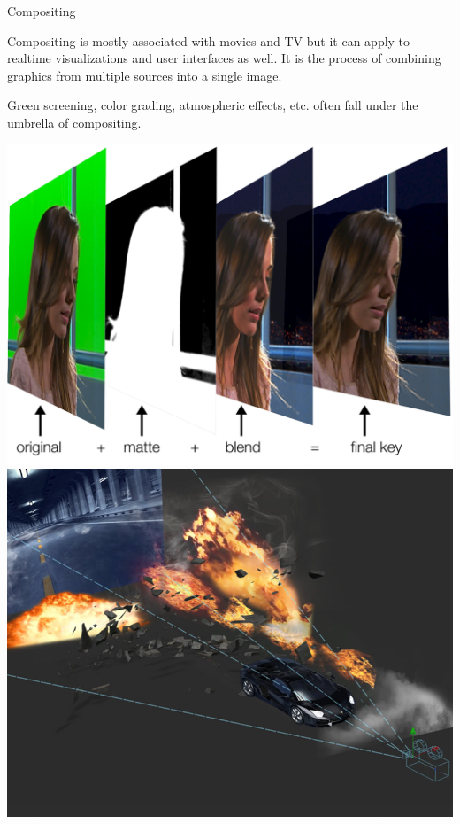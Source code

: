 \documentclass{lug}
\newcommand{\splitslide}[4]{
    \noindent
    \begin{minipage}{#1 \textwidth - #2 }
        #3
    \end{minipage}%
    \hspace{ \dimexpr #2 * 2 \relax }%
    \begin{minipage}{\textwidth - #1 \textwidth - #2 }
        #4
    \end{minipage}
}
\begin{document}
\begin{frame}{Compositing}
    \splitslide{0.65}{.7em}{
        \small

        Compositing is mostly associated with movies and TV but it can apply
        to realtime visualizations and user interfaces as well. It is the
        process of combining graphics from multiple sources into a single
        image.

        \vspace{1ex}

        Green screening, color grading, atmospheric effects, etc. often fall
        under the umbrella of compositing.

    }{
        \includegraphics[width=\textwidth]{graphics/compositing_matte} \\
        \includegraphics[width=\textwidth]{graphics/compositing}
    }
    \noindent
\end{frame}
\end{document}
